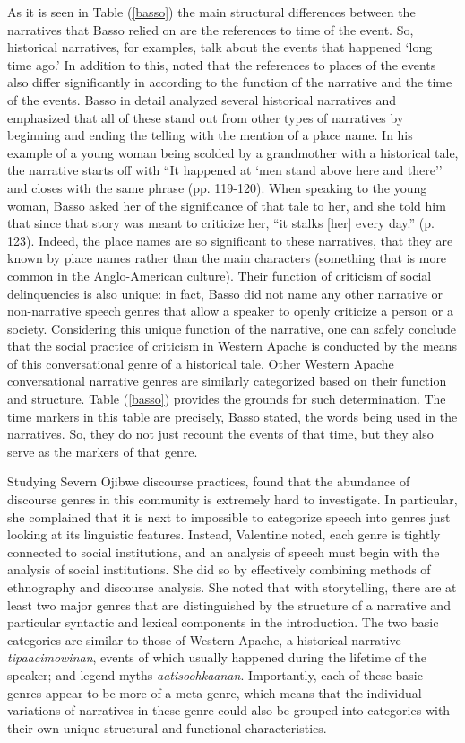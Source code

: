 \documentclass[12pt]{article}
\begin{document}
As it is seen in Table (\ref{basso}) the main structural differences between the narratives that Basso relied on are the references to time of the event. So, historical narratives, for examples, talk about the events that happened `long time ago.' In addition to this, \textcite{basso1990} noted that the references to places of the events also differ significantly in according to the function of the narrative and the time of the events. Basso in detail analyzed several historical narratives and emphasized that all of these stand out from other types of narratives by beginning and ending the telling with the mention of a place name. In his example of a young woman being scolded by a grandmother with a historical tale, the narrative starts off with ``It happened at `men stand above here and there'' and closes with the same phrase (pp. 119-120). When speaking to the young woman, Basso asked her of the significance of that tale to her, and she told him that since that story was meant to criticize her, ``it stalks [her] every day.'' (p. 123). Indeed, the place names are so significant to these narratives, that they are known by place names rather than the main characters (something that is more common in the Anglo-American culture). Their function of criticism of social delinquencies is also unique: in fact, Basso did not name any other narrative or non-narrative speech genres that allow a speaker to openly criticize a person or a society. Considering this unique function of the narrative, one can safely conclude that the social practice of criticism in Western Apache is conducted by the means of this conversational genre of a historical tale. Other Western Apache conversational narrative genres are similarly categorized based on their function and structure. Table (\ref{basso}) provides the grounds for such determination. The time markers in this table are precisely, Basso stated, the words being used in the narratives. So, they do not just recount the events of that time, but they also serve as the markers of that genre. 

Studying Severn Ojibwe discourse practices, \textcite{valentine1995} found that the abundance of discourse genres in this community is extremely hard to investigate. In particular, she complained that it is next to impossible to categorize speech into genres just looking at its linguistic features. Instead, Valentine noted, each genre is tightly connected to  social institutions, and an analysis of speech must begin with the analysis of social institutions. She did so by effectively combining methods of ethnography and discourse analysis. She noted that with storytelling, there are at least two major genres that are distinguished by the structure of a narrative and particular syntactic and lexical components in the introduction. The two basic categories are similar to those of Western Apache, a historical narrative \textit{tipaacimowinan}, events of which usually happened during the lifetime of the speaker; and legend-myths \textit{aatisoohkaanan}. Importantly, each of these basic genres appear to be more of a meta-genre, which means that the individual variations of narratives in these genre could also be grouped into categories with their own unique structural and functional characteristics.
\end{document}

